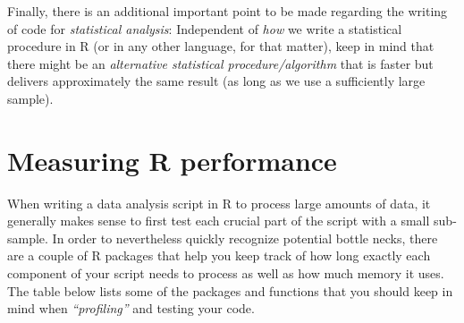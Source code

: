 \documentclass[
  12pt,
]{style/krantz}
\begin{document}
Finally, there is an additional important point to be made regarding the writing of code for \emph{statistical analysis}: Independent of \emph{how} we write a statistical procedure in R (or in any other language, for that matter), keep in mind that there might be an \emph{alternative statistical procedure/algorithm} that is faster but delivers approximately the same result (as long as we use a sufficiently large sample).

\hypertarget{measuring-r-performance}{%
\section{Measuring R performance}\label{measuring-r-performance}}

When writing a data analysis script in R to process large amounts of data, it generally makes sense to first test each crucial part of the script with a small sub-sample. In order to nevertheless quickly recognize potential bottle necks, there are a couple of R packages that help you keep track of how long exactly each component of your script needs to process as well as how much memory it uses. The table below lists some of the packages and functions that you should keep in mind when \emph{``profiling''} and testing your code.
\end{document}

